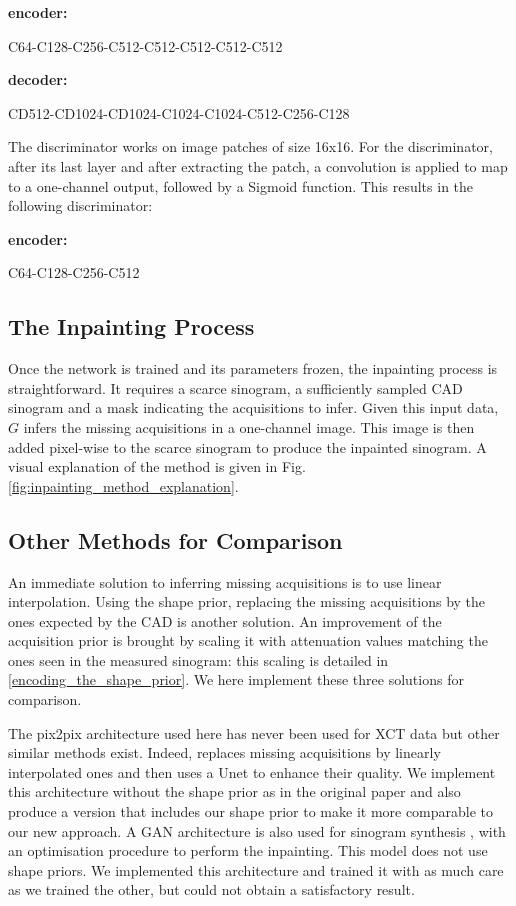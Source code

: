 \documentclass[../main.tex]{subfiles}
\begin{document}
\textbf{encoder:}

C64-C128-C256-C512-C512-C512-C512-C512

\textbf{decoder:}

CD512-CD1024-CD1024-C1024-C1024-C512-C256-C128

The discriminator works on image patches of size 16x16. For the discriminator, after its last layer and after extracting the patch, a convolution is applied to map to a one-channel output, followed by a Sigmoid function. This results in the following discriminator:

\textbf{encoder:}

C64-C128-C256-C512

\subsection{The Inpainting Process}
Once the network is trained and its parameters frozen, the inpainting process is straightforward. It requires a scarce sinogram, a sufficiently sampled CAD sinogram and a mask indicating the acquisitions to infer. Given this input data, $\mathit{G}$ infers the missing acquisitions in a one-channel image. This image is then added pixel-wise to the scarce sinogram to produce the inpainted sinogram. A visual explanation of the method is given in Fig. \ref{fig:inpainting_method_explanation}.

\subsection{Other Methods for Comparison}
An immediate solution to inferring missing acquisitions is to use linear interpolation. Using the shape prior, replacing the missing acquisitions by the ones expected by the CAD is another solution. An improvement of the acquisition prior is brought by scaling it with attenuation values matching the ones seen in the measured sinogram: this scaling is detailed in \ref{encoding_the_shape_prior}. We here implement these three solutions for comparison.

The pix2pix architecture used here has never been used for XCT data but other similar methods exist. Indeed, \cite{lee2018deep} replaces missing acquisitions by linearly interpolated ones and then uses a Unet \cite{ronneberger2015u} to enhance their quality. We implement this architecture without the shape prior as in the original paper and also produce a version that includes our shape prior to make it more comparable to our new approach. A GAN architecture is also used for sinogram synthesis \cite{yoo2019sinogram}, with an optimisation procedure to perform the inpainting. This model does not use shape priors. We implemented this architecture and trained it with as much care as we trained the other, but could not obtain a satisfactory result. 
\end{document}

